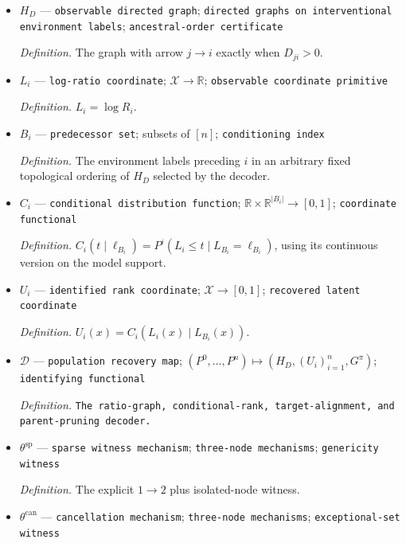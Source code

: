 \documentclass{article}
\begin{document}
\begin{itemize}
  \par\smallskip\noindent\emph{Definition.} \texttt{The mechanisms with positive Gaussian-\allowbreak{}kernel MMD on every ancestral cover.}
  \item \(H_D\) --- \texttt{observable directed graph}; \texttt{directed graphs on interventional environment labels}; \texttt{ancestral-\allowbreak{}order certificate}
  \par\smallskip\noindent\emph{Definition.} The graph with arrow \(j\to i\) exactly when \(D_{ji}>0\).
  \item \(L_i\) --- \texttt{log-\allowbreak{}ratio coordinate}; \(\mathcal X\to\mathbb R\); \texttt{observable coordinate primitive}
  \par\smallskip\noindent\emph{Definition.} \(L_i=\log R_i\).
  \item \(B_i\) --- \texttt{predecessor set}; subsets of \([n]\); \texttt{conditioning index}
  \par\smallskip\noindent\emph{Definition.} The environment labels preceding \(i\) in an arbitrary fixed topological ordering of \(H_D\) selected by the decoder.
  \item \(C_i\) --- \texttt{conditional distribution function}; \(\mathbb R\times\mathbb R^{|B_i|}\to[0,1]\); \texttt{coordinate functional}
  \par\smallskip\noindent\emph{Definition.} \(C_i(t\mid\ell_{B_i})=P^i(L_i\le t\mid L_{B_i}=\ell_{B_i})\), using its continuous version on the model support.
  \item \(U_i\) --- \texttt{identified rank coordinate}; \(\mathcal X\to[0,1]\); \texttt{recovered latent coordinate}
  \par\smallskip\noindent\emph{Definition.} \(U_i(x)=C_i(L_i(x)\mid L_{B_i}(x))\).
  \item \(\mathscr D\) --- \texttt{population recovery map}; \((P^0,\ldots,P^n)\mapsto(H_D,(U_i)_{i=1}^n,G^\pi)\); \texttt{identifying functional}
  \par\smallskip\noindent\emph{Definition.} \texttt{The ratio-\allowbreak{}graph,\allowbreak{} conditional-\allowbreak{}rank,\allowbreak{} target-\allowbreak{}alignment,\allowbreak{} and parent-\allowbreak{}pruning decoder.}
  \item \(\theta^{\mathrm{sp}}\) --- \texttt{sparse witness mechanism}; \texttt{three-\allowbreak{}node mechanisms}; \texttt{genericity witness}
  \par\smallskip\noindent\emph{Definition.} The explicit \(1\to2\) plus isolated-node witness.
  \item \(\theta^{\mathrm{can}}\) --- \texttt{cancellation mechanism}; \texttt{three-\allowbreak{}node mechanisms}; \texttt{exceptional-\allowbreak{}set witness}

\end{itemize}
\end{document}
